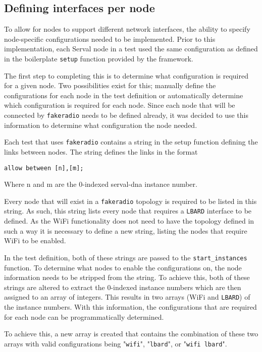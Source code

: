 \subsection{Defining interfaces per node}
\label{subsection:DefiningInterfaces}
To allow for nodes to support different network interfaces, the ability to specify node-specific configurations needed to be implemented.
Prior to this implementation, each Serval node in a test used the same configuration as defined in the boilerplate \texttt{setup} function provided by the framework.

The first step to completing this is to determine what configuration is required for a given node.
Two possibilities exist for this; manually define the configurations for each node in the test definition or automatically determine which configuration is required for each node.
Since each node that will be connected by \texttt{fakeradio} needs to be defined already, it was decided to use this information to determine what configuration the node needed.

Each test that uses \texttt{fakeradio} contains a string in the setup function defining the links between nodes.
The string defines the links in the format 

\texttt{allow between [n],[m];} 

Where n and m are the 0-indexed serval-dna instance number.

Every node that will exist in a \texttt{fakeradio} topology is required to be listed in this string.
As such, this string lists every node that requires a \texttt{LBARD} interface to be defined.
As the WiFi functionality does not need to have the topology defined in such a way it is necessary to define a new string, listing the nodes that require WiFi to be enabled. 

In the test definition, both of these strings are passed to the \texttt{start\_instances} function.
To determine what nodes to enable the configurations on, the node information needs to be stripped from the string.
To achieve this, both of these strings are altered to extract the 0-indexed instance numbers which are then assigned to an array of integers.
This results in two arrays (WiFi and \texttt{LBARD}) of the instance numbers.
With this information, the configurations that are required for each node can be programmatically determined.

To achieve this, a new array is created that contains the combination of these two arrays with valid configurations being "\texttt{wifi}", "\texttt{lbard}", or "\texttt{wifi lbard}".

